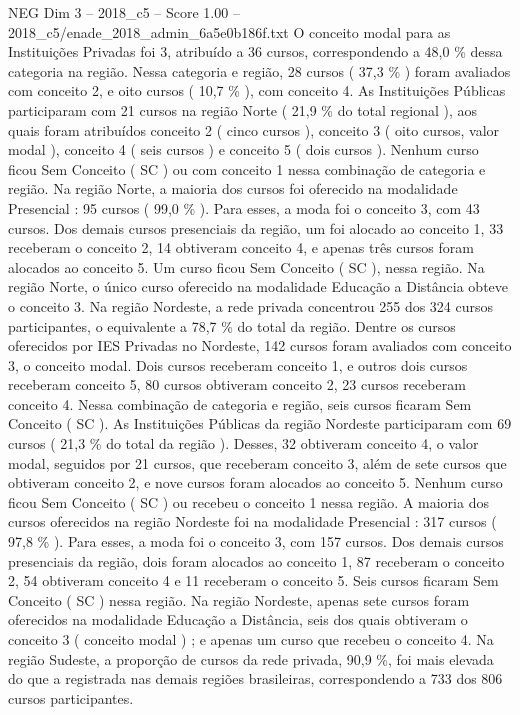 \begin{textsample}{NEG Dim 3 – 2018\_c5 – Score 1.00 – 2018\_c5/enade\_2018\_admin\_6a5e0b186f.txt}
O conceito modal para as Instituições Privadas foi 3, atribuído a 36 cursos, correspondendo a 48,0 \% dessa categoria na região.
Nessa categoria e região, 28 cursos ( 37,3 \% ) foram avaliados com conceito 2, e oito cursos ( 10,7 \% ), com conceito 4.
As Instituições Públicas participaram com 21 cursos na região Norte ( 21,9 \% do total regional ), aos quais foram atribuídos conceito 2 ( cinco cursos ), conceito 3 ( oito cursos, valor modal ), conceito 4 ( seis cursos ) e conceito 5 ( dois cursos ).
Nenhum curso ficou Sem Conceito ( SC ) ou com conceito 1 nessa combinação de categoria e região.
Na região Norte, a maioria dos cursos foi oferecido na modalidade Presencial : 95 cursos ( 99,0 \% ).
Para esses, a moda foi o conceito 3, com 43 cursos.
Dos demais cursos presenciais da região, um foi alocado ao conceito 1, 33 receberam o conceito 2, 14 obtiveram conceito 4, e apenas três cursos foram alocados ao conceito 5.
Um curso ficou Sem Conceito ( SC ), nessa região.
Na região Norte, o único curso oferecido na modalidade Educação a Distância obteve o conceito 3.
Na região Nordeste, a rede privada concentrou 255 dos 324 cursos participantes, o equivalente a 78,7 \% do total da região.
Dentre os cursos oferecidos por IES Privadas no Nordeste, 142 cursos foram avaliados com conceito 3, o conceito modal.
Dois cursos receberam conceito 1, e outros dois cursos receberam conceito 5, 80 cursos obtiveram conceito 2, 23 cursos receberam conceito 4.
Nessa combinação de categoria e região, seis cursos ficaram Sem Conceito ( SC ).
As Instituições Públicas da região Nordeste participaram com 69 cursos ( 21,3 \% do total da região ).
Desses, 32 obtiveram conceito 4, o valor modal, seguidos por 21 cursos, que receberam conceito 3, além de sete cursos que obtiveram conceito 2, e nove cursos foram alocados ao conceito 5.
Nenhum curso ficou Sem Conceito ( SC ) ou recebeu o conceito 1 nessa região.
A maioria dos cursos oferecidos na região Nordeste foi na modalidade Presencial : 317 cursos ( 97,8 \% ).
Para esses, a moda foi o conceito 3, com 157 cursos.
Dos demais cursos presenciais da região, dois foram alocados ao conceito 1, 87 receberam o conceito 2, 54 obtiveram conceito 4 e 11 receberam o conceito 5.
Seis cursos ficaram Sem Conceito ( SC ) nessa região.
Na região Nordeste, apenas sete cursos foram oferecidos na modalidade Educação a Distância, seis dos quais obtiveram o conceito 3 ( conceito modal ) ; e apenas um curso que recebeu o conceito 4.
Na região Sudeste, a proporção de cursos da rede privada, 90,9 \%, foi mais elevada do que a registrada nas demais regiões brasileiras, correspondendo a 733 dos 806 cursos participantes.

\end{textsample}
